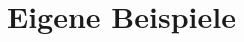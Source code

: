 %
%
%
%
%
%
%
%
%
%
%
%
%
%
%
%
%
%
%
%
%
%
%
%
%
%
%
%
%
%
%
%
%
%
%
%
%
%
%
%
%
%
%

\clearpage

\section{Eigene Beispiele}

